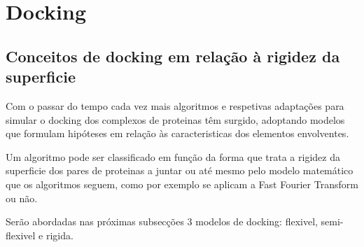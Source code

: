 %



\section{Docking}
\subsection{Conceitos de docking em relação à rigidez da superficie}
\label{classi}
Com o passar do tempo cada vez mais algoritmos e respetivas adaptações para simular o docking dos complexos de proteinas têm surgido, adoptando modelos que formulam hipóteses em relação às caracteristicas dos elementos envolventes. 

Um algoritmo pode ser classificado em função da forma que trata a rigidez  da superficie dos pares de proteinas a juntar ou até mesmo pelo modelo matemático que os algoritmos seguem, como por exemplo se aplicam a Fast Fourier Transform ou não.

Serão abordadas nas próximas subsecções 3 modelos de docking: flexivel, semi-flexivel e rigida. %



